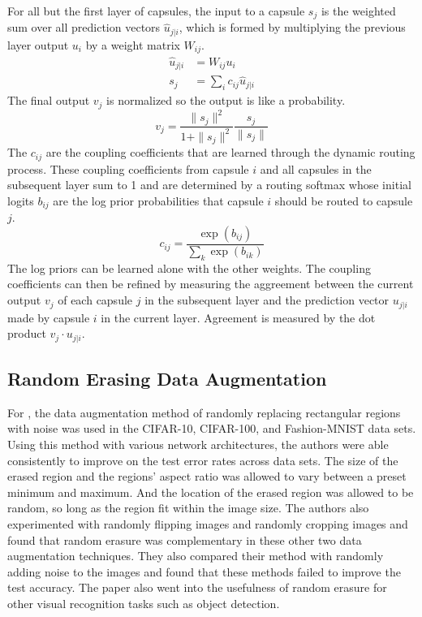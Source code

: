 \documentclass{IEEEtran}
\begin{document}
For all but the first layer of capsules, the input to a capsule \(s_{j}\) is the
weighted sum over all prediction vectors \(\hat{u}_{j|i}\), which is formed by
multiplying the previous layer output \(u_{i}\) by a weight matrix \(W_{ij}\).
\begin{align*}
    \hat{u}_{j|i} & = W_{i j} u_{i} \\
    s_{j} & = \sum_{i} c_{i j} \hat{u}_{j|i}
\end{align*}
The final output \(v_{j}\) is normalized so the output is like a probability.
\[v_{j} = \frac{\|s_{j}\|^{2}}{1 + \|s_{j}\|^{2}}\frac{s_{j}}{\|s_{j}\|}\]
The \(c_{ij}\) are the coupling coefficients that are learned through the
dynamic routing process. These coupling coefficients from capsule \(i\) and all
capsules in the subsequent layer sum to 1 and are determined by a routing
softmax whose initial logits \(b_{ij}\) are the log prior probabilities that
capsule \(i\) should be routed to capsule \(j\).
\[c_{ij} = \frac{\exp\left(b_{ij}\right)}{\sum_{k} \exp\left(b_{ik}\right)}\]
The log priors can be learned alone with the other weights. The coupling
coefficients can then be refined by measuring the aggreement between the current
output \(v_{j}\) of each capsule \(j\) in the subsequent layer and the
prediction vector \(u_{j|i}\) made by capsule \(i\) in the current layer.
Agreement is measured by the dot product \(v_{j}\cdot u_{j|i}\).

\subsection{Random Erasing Data Augmentation}
For \cite{zhong2017random}, the data augmentation method of randomly replacing
rectangular regions with noise was used in the CIFAR-10, CIFAR-100, and
Fashion-MNIST data sets. Using this method with various network architectures,
the authors were able consistently to improve on the test error rates across
data sets. The size of the erased region and the regions' aspect ratio was
allowed to vary between a preset minimum and maximum. And the location of the
erased region was allowed to be random, so long as the region fit within the
image size. The authors also experimented with randomly flipping images and
randomly cropping images and found that random erasure was complementary in
these other two data augmentation techniques. They also compared their method
with randomly adding noise to the images and found that these methods failed to
improve the test accuracy. The paper also went into the usefulness of random 
erasure for other visual recognition tasks such as object detection.
\end{document}
